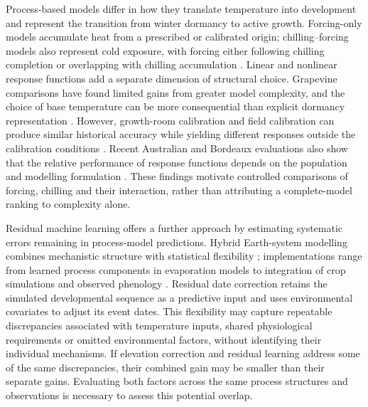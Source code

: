 \documentclass[a4paper,12pt]{article}
\begin{document}
Process-based models differ in how they translate temperature into development and represent the transition from winter dormancy to active growth. Forcing-only models accumulate heat from a prescribed or calibrated origin; chilling--forcing models also represent cold exposure, with forcing either following chilling completion or overlapping with chilling accumulation \citep{chuineUnifiedModelBudburst2000,chuineProcessBasedModelsPhenology2017}. Linear and nonlinear response functions add a separate dimension of structural choice. Grapevine comparisons have found limited gains from greater model complexity, and the choice of base temperature can be more consequential than explicit dormancy representation \citep{garciadecortazar-atauriPerformanceSeveralModels2009,filaComparisonDifferentModelling2014}. However, growth-room calibration and field calibration can produce similar historical accuracy while yielding different responses outside the calibration conditions \citep{filaCalibrationValidationGrapevine2012}. Recent Australian and Bordeaux evaluations also show that the relative performance of response functions depends on the population and modelling formulation \citep{thomasDevelopingTestingWinegrape2026,deresseguierModelingGrapevinePhenology2026}. These findings motivate controlled comparisons of forcing, chilling and their interaction, rather than attributing a complete-model ranking to complexity alone.

Residual machine learning offers a further approach by estimating systematic errors remaining in process-model predictions. Hybrid Earth-system modelling combines mechanistic structure with statistical flexibility \citep{reichsteinDeepLearningProcess2019}; implementations range from learned process components in evaporation models to integration of crop simulations and observed phenology \citep{koppaHybridEvaporation2022,ouContinuousLearningFramework2025}. Residual date correction retains the simulated developmental sequence as a predictive input and uses environmental covariates to adjust its event dates. This flexibility may capture repeatable discrepancies associated with temperature inputs, shared physiological requirements or omitted environmental factors, without identifying their individual mechanisms. If elevation correction and residual learning address some of the same discrepancies, their combined gain may be smaller than their separate gains. Evaluating both factors across the same process structures and observations is necessary to assess this potential overlap.
\end{document}
